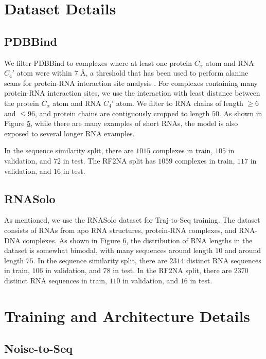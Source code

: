 \documentclass{article}
\theoremstyle{plain}
\theoremstyle{definition}
\theoremstyle{remark}
\begin{document}
\section{Dataset Details}

\subsection{PDBBind}

We filter PDBBind to complexes where at least one protein $C_\alpha$ atom and RNA $C_{4}'$ atom were  within $7$ \AA, a threshold that has been used to perform alanine scans for protein-RNA interaction site analysis \cite{kruger2018protein}. For complexes containing many protein-RNA interaction sites, we use the interaction with least distance between the protein $C_\alpha$ atom and RNA $C_{4}'$ atom. We filter to RNA chains of length $\geq 6$ and $\leq 96$, and protein chains are contiguously cropped to length $50$. As shown in Figure \hyperref[fig:lengths]{5}, while there are many examples of short RNAs, the model is also exposed to several longer RNA examples. 

In the sequence similarity split, there are $1015$ complexes in train, $105$ in validation, and $72$ in test. The RF2NA split has $1059$ complexes in train, $117$ in validation, and $16$ in test. 



\subsection{RNASolo}

As mentioned, we use the RNASolo dataset for Traj-to-Seq training. The dataset consists of RNAs from apo RNA structures, protein-RNA complexes, and RNA-DNA complexes. As shown in Figure \hyperref[fig:lengths2]{6}, the distribution of RNA lengths in the dataset is somewhat bimodal, with many sequences around length $10$ and around length $75$. In the sequence similarity split, there are $2314$ distinct RNA sequences in train, $106$ in validation, and $78$ in test. In the RF2NA split, there are $2370$ distinct RNA sequences in train, $110$ in validation, and $16$ in test. 

\section{Training and Architecture Details}

\subsection{Noise-to-Seq}
\end{document}
